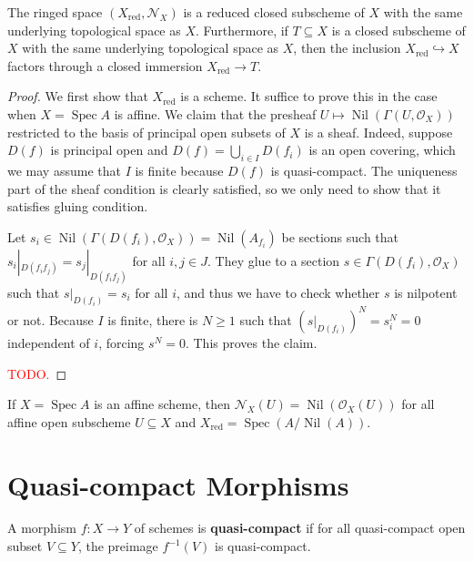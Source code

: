 \documentclass[12pt]{book}
\newcommand{\inlinedef}[1]{\textcolor{oxfordblue}{\bfseries #1}}
\theoremstyle{definition}
\DeclareMathOperator{\Spec}{Spec}
\DeclareMathOperator{\Nil}{Nil} %
\newcommand{\reduced}{\mathrm{red}}
\newcommand{\todo}[1]{\textcolor{red}{#1}}
\begin{document}
	\begin{theorem}
		The ringed space $(X_{\reduced}, \mathcal{N}_X)$ is a reduced closed subscheme of $X$ with the same underlying topological space as $X$. Furthermore, if $T \subseteq X$ is a closed subscheme of $X$ with the same underlying topological space as $X$, then the inclusion $X_{\reduced} \hookrightarrow X$ factors through a closed immersion $X_{\reduced} \to T$.
	\end{theorem}
	\begin{proof}
		We first show that $X_{\reduced}$ is a scheme. It suffice to prove this in the case when $X = \Spec A$ is affine. We claim that the presheaf $U \mapsto \Nil(\Gamma(U, \mathcal{O}_X))$ restricted to the basis of principal open subsets of $X$ is a sheaf. Indeed, suppose $D(f)$ is principal open and $D(f) = \bigcup_{i \in I}D(f_i)$ is an open covering, which we may assume that $I$ is finite because $D(f)$ is quasi-compact. The uniqueness part of the sheaf condition is clearly satisfied, so we only need to show that it satisfies gluing condition.
		
		Let $s_i \in \Nil(\Gamma(D(f_i), \mathcal{O}_X)) = \Nil(A_{f_i})$ be sections such that $s_i|_{D(f_if_j)} = s_j|_{D(f_if_j)}$ for all $i, j \in J$. They glue to a section $s \in \Gamma(D(f_i), \mathcal{O}_X)$ such that $s|_{D(f_i)} = s_i$ for all $i$, and thus we have to check whether $s$ is nilpotent or not. Because $I$ is finite, there is $N \geq 1$ such that $(s|_{D(f_i)})^N = s_i^N = 0$ independent of $i$, forcing $s^N = 0$. This proves the claim.
		
		\todo{TODO.}
	\end{proof}
	
	\begin{corollary}
		If $X = \Spec A$ is an affine scheme, then $\mathcal{N}_X(U) = \Nil(\mathcal{O}_X(U))$ for all affine open subscheme $U \subseteq X$ and $X_{\reduced} = \Spec(A/\Nil(A))$.
	\end{corollary}
	
	
	
	\begin{definition}
		
	\end{definition}
	
	\section{Quasi-compact Morphisms}
	
	\begin{definition}
		A morphism $f \colon X \to Y$ of schemes is \inlinedef{quasi-compact} if for all quasi-compact open subset $V \subseteq Y$, the preimage $f^{-1}(V)$ is quasi-compact.
	\end{definition}
	
\end{document}
